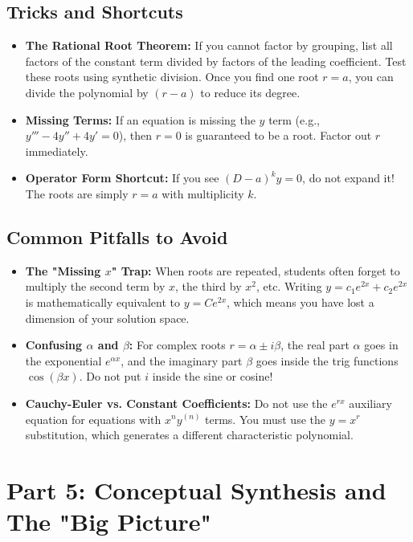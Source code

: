 \documentclass[11pt]{article}
\begin{document}
\subsection{Tricks and Shortcuts}
\begin{itemize}
    \item \textbf{The Rational Root Theorem:} If you cannot factor by grouping, list all factors of the constant term divided by factors of the leading coefficient. Test these roots using synthetic division. Once you find one root $r=a$, you can divide the polynomial by $(r-a)$ to reduce its degree.
    \item \textbf{Missing Terms:} If an equation is missing the $y$ term (e.g., $y''' - 4y'' + 4y' = 0$), then $r=0$ is guaranteed to be a root. Factor out $r$ immediately.
    \item \textbf{Operator Form Shortcut:} If you see $(D - a)^k y = 0$, do not expand it! The roots are simply $r = a$ with multiplicity $k$.
\end{itemize}

\subsection{Common Pitfalls to Avoid}
\begin{itemize}
    \item \textbf{The "Missing $x$" Trap:} When roots are repeated, students often forget to multiply the second term by $x$, the third by $x^2$, etc. Writing $y = c_1 e^{2x} + c_2 e^{2x}$ is mathematically equivalent to $y = C e^{2x}$, which means you have lost a dimension of your solution space.
    \item \textbf{Confusing $\alpha$ and $\beta$:} For complex roots $r = \alpha \pm i\beta$, the real part $\alpha$ goes in the exponential $e^{\alpha x}$, and the imaginary part $\beta$ goes inside the trig functions $\cos(\beta x)$. Do not put $i$ inside the sine or cosine!
    \item \textbf{Cauchy-Euler vs. Constant Coefficients:} Do not use the $e^{rx}$ auxiliary equation for equations with $x^n y^{(n)}$ terms. You must use the $y = x^r$ substitution, which generates a different characteristic polynomial.
\end{itemize}

\newpage
\section{Part 5: Conceptual Synthesis and The "Big Picture"}
\end{document}
